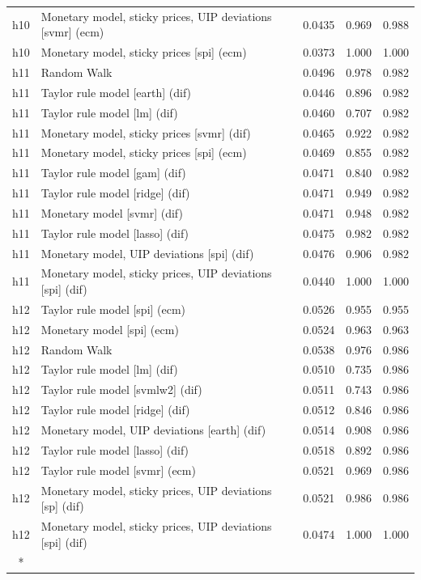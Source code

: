 \begin{ThreePartTable}
\begin{longtable}[t]{cp{5.5cm}ccc}
h10 & \raggedright Monetary model, sticky prices, UIP deviations [svmr] (ecm) & 0.0435 & 0.969 & 0.988\\
h10 & \raggedright Monetary model, sticky prices [spi] (ecm) & 0.0373 & 1.000 & 1.000\\
\addlinespace
h11 & \raggedright Random Walk & 0.0496 & 0.978 & 0.982\\
h11 & \raggedright Taylor rule model [earth] (dif) & 0.0446 & 0.896 & 0.982\\
h11 & \raggedright Taylor rule model [lm] (dif) & 0.0460 & 0.707 & 0.982\\
h11 & \raggedright Monetary model, sticky prices [svmr] (dif) & 0.0465 & 0.922 & 0.982\\
h11 & \raggedright Monetary model, sticky prices [spi] (ecm) & 0.0469 & 0.855 & 0.982\\
h11 & \raggedright Taylor rule model [gam] (dif) & 0.0471 & 0.840 & 0.982\\
h11 & \raggedright Taylor rule model [ridge] (dif) & 0.0471 & 0.949 & 0.982\\
h11 & \raggedright Monetary model [svmr] (dif) & 0.0471 & 0.948 & 0.982\\
h11 & \raggedright Taylor rule model [lasso] (dif) & 0.0475 & 0.982 & 0.982\\
h11 & \raggedright Monetary model, UIP deviations [spi] (dif) & 0.0476 & 0.906 & 0.982\\
h11 & \raggedright Monetary model, sticky prices, UIP deviations [spi] (dif) & 0.0440 & 1.000 & 1.000\\
\addlinespace
h12 & \raggedright Taylor rule model [spi] (ecm) & 0.0526 & 0.955 & 0.955\\
h12 & \raggedright Monetary model [spi] (ecm) & 0.0524 & 0.963 & 0.963\\
h12 & \raggedright Random Walk & 0.0538 & 0.976 & 0.986\\
h12 & \raggedright Taylor rule model [lm] (dif) & 0.0510 & 0.735 & 0.986\\
h12 & \raggedright Taylor rule model [svmlw2] (dif) & 0.0511 & 0.743 & 0.986\\
h12 & \raggedright Taylor rule model [ridge] (dif) & 0.0512 & 0.846 & 0.986\\
h12 & \raggedright Monetary model, UIP deviations [earth] (dif) & 0.0514 & 0.908 & 0.986\\
h12 & \raggedright Taylor rule model [lasso] (dif) & 0.0518 & 0.892 & 0.986\\
h12 & \raggedright Taylor rule model [svmr] (ecm) & 0.0521 & 0.969 & 0.986\\
h12 & \raggedright Monetary model, sticky prices, UIP deviations [sp] (dif) & 0.0521 & 0.986 & 0.986\\
h12 & \raggedright Monetary model, sticky prices, UIP deviations [spi] (dif) & 0.0474 & 1.000 & 1.000\\*
\end{longtable}
\end{ThreePartTable}
\endgroup{}
